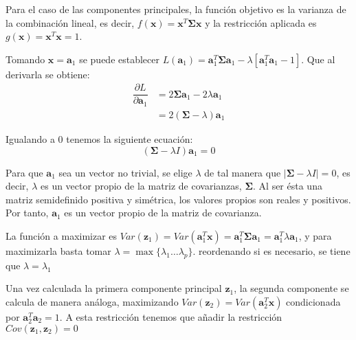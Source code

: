 \noindent Para el caso de las componentes principales, la función objetivo es la varianza de la combinación lineal, es decir, $f(\textbf{x})=\textbf{x}^T \mathbf{\Sigma} \textbf{x}$ y la restricción aplicada es $g(\textbf{x})=\textbf{x}^T\textbf{x}=1$. 

\noindent Tomando $\textbf{x}=\textbf{a}_1$ se puede establecer $L(\textbf{a}_1)=\textbf{a}_1^T \mathbf{\Sigma} \textbf{a}_1 - \lambda[\textbf{a}_1^T \textbf{a}_1-1]$. Que al derivarla se obtiene:
\begin{align*}
\dfrac{\partial L}{\partial \textbf{a}_1} &= 2\mathbf{\Sigma} \textbf{a}_1 - 2\lambda\textbf{a}_1\\
& = 2(\mathbf{\Sigma}-\lambda)\textbf{a}_1 
\end{align*}

\noindent Igualando a 0 tenemos la siguiente ecuación: 
\begin{equation}
(\mathbf{\Sigma}-\lambda I)\textbf{a}_1=0
\end{equation}

\noindent Para que $\textbf{a}_1$ sea un vector no trivial, se elige $\lambda$ de tal manera que $|\mathbf{\Sigma}-\lambda I| = 0$, es decir, $\lambda$ es un vector propio de la matriz de covarianzas, $\mathbf{\Sigma}$. Al ser ésta una matriz semidefinido positiva y simétrica, los valores propios son reales y positivos. Por tanto, $\textbf{a}_1$ es un vector propio de la matriz de covarianza.

\noindent La función a maximizar es $Var(\textbf{z}_1)=Var(\textbf{a}_1^T\textbf{x})=\textbf{a}_1^T\mathbf{\Sigma} \textbf{a}_1=\textbf{a}_1^T\lambda \textbf{a}_1$, y para maximizarla basta tomar $\lambda=\max{\lbrace\lambda_1\ldots \lambda_p\rbrace}$. reordenando si es necesario, se tiene que $\lambda=\lambda_1$ 

\noindent Una vez calculada la primera componente principal $\textbf{z}_1$, la segunda componente se calcula de manera análoga, maximizando $Var(\textbf{z}_2)=Var(\textbf{a}_2^T\textbf{x})$ condicionada por $\textbf{a}_2^T\textbf{a}_2=1$. A esta restricción tenemos que añadir la restricción $Cov(\textbf{z}_1,\textbf{z}_2)=0 $

